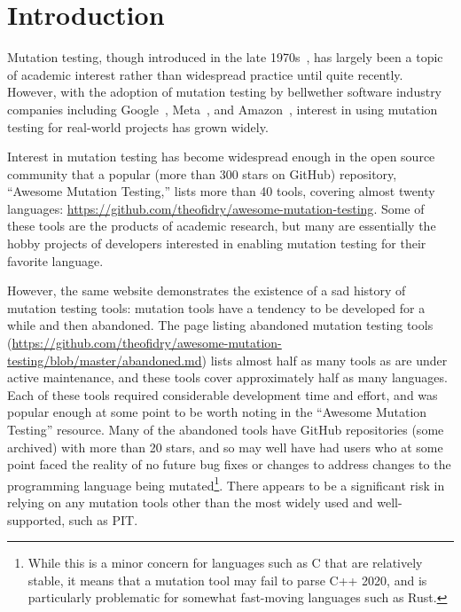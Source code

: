 \documentclass[sigconf,review, anonymous]{acmart}
\begin{document}
\section{Introduction}

Mutation testing, though introduced in the late
1970s~\cite{demillo1978hints,mathur2012foundations,demillo1978hints},
has largely been a topic of academic interest rather than widespread
practice until quite recently.  However, with the adoption of mutation
testing by bellwether software industry companies including
Google~\cite{GoogleMut}, Meta~\cite{BellerFacebookMutation}, and
Amazon~\cite{AmazonMut}, interest in using mutation testing for
real-world projects has grown widely.

Interest in mutation testing has become widespread enough in the open
source community that a popular (more than 300 stars on GitHub)
repository, ``Awesome Mutation Testing,'' lists more than 40 tools,
covering almost twenty languages:
\url{https://github.com/theofidry/awesome-mutation-testing}.  Some of
these tools are the products of academic research, but many are
essentially the hobby projects of developers interested in enabling
mutation testing for their favorite language.

However, the same website demonstrates the existence of a sad history
of mutation testing tools: mutation tools have a tendency to be
developed for a while and then abandoned.   The page listing abandoned
mutation testing tools
(\url{https://github.com/theofidry/awesome-mutation-testing/blob/master/abandoned.md})
lists almost half as many tools as are under active maintenance, and
these tools cover approximately half as many languages.  Each of these
tools required considerable development time and effort, and was
popular enough at some point to be worth noting in the ``Awesome
Mutation Testing'' resource.  Many of the abandoned tools have GitHub
repositories (some archived) with more than 20 stars, and so may well
have had users who at some point faced the reality of no future bug
fixes or changes to address changes to the programming language being
mutated\footnote{While this is a minor concern for languages such as C
  that are relatively stable, it means that a mutation tool may fail
  to parse C++ 2020, and is particularly problematic for somewhat
  fast-moving languages such as Rust.}.  There
appears to be a significant risk in relying on any mutation tools other
than the most widely used and well-supported, such as PIT.
\end{document}
